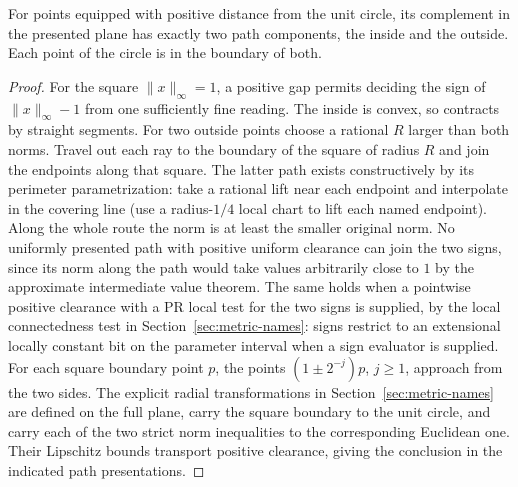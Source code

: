 \begin{corollary}\label{cor:circlePlane}\label{idx-plane61}
For points equipped with positive distance from the unit circle, its complement in the presented plane has exactly two path components, the inside and the outside. Each point of the circle is in the boundary of both.
\end{corollary}
\begin{proof}
For the square $\|x\|_\infty=1$, a positive gap permits deciding the sign of $\|x\|_\infty-1$ from one sufficiently fine reading. The inside is convex, so contracts by straight segments. For two outside points choose a rational $R$ larger than both norms. Travel out each ray to the boundary of the square of radius $R$ and join the endpoints along that square. The latter path exists constructively by its perimeter parametrization: take a rational lift near each endpoint and interpolate in the covering line (use a radius-$1/4$ local chart to lift each named endpoint). Along the whole route the norm is at least the smaller original norm. No uniformly presented path with positive uniform clearance can join the two signs, since its norm along the path would take values arbitrarily close to $1$ by the approximate intermediate value theorem. The same holds when a pointwise positive clearance with a PR local test for the two signs is supplied, by the local connectedness test in Section~\ref{sec:metric-names}: signs restrict to an extensional locally constant bit on the parameter interval when a sign evaluator is supplied. For each square boundary point $p$, the points $(1\pm 2^{-j})p$, $j\ge1$, approach from the two sides. The explicit radial transformations in Section~\ref{sec:metric-names} are defined on the full plane, carry the square boundary to the unit circle, and carry each of the two strict norm inequalities to the corresponding Euclidean one. Their Lipschitz bounds transport positive clearance, giving the conclusion in the indicated path presentations.
\end{proof}
